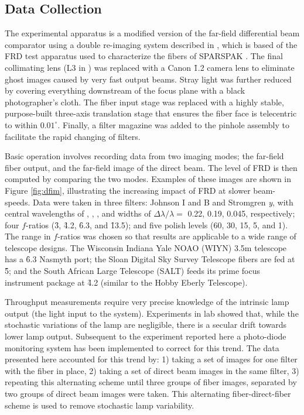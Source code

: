 \subsection{Data Collection}
\label{FRD:sec:direct}
The experimental apparatus is a modified version of the far-field
differential beam comparator using a double re-imaging system
described in \citet{Crause_08}, which is based of the FRD test
apparatus used to characterize the fibers of SPARSPAK
\citep{Mab_04}. The final collimating lens (L3 in \citet{Crause_08})
was replaced with a Canon \f1.2 camera lens to eliminate ghost images
caused by very fast output beams. Stray light was further reduced by
covering everything downstream of the focus plane with a black
photographer's cloth. The fiber input stage was replaced with a highly
stable, purpose-built three-axis translation stage that ensures the
fiber face is telecentric to within $0.01^{\circ}$. Finally, a filter
magazine was added to the pinhole assembly to facilitate the rapid
changing of filters.

Basic operation involves recording data from two imaging modes; the
far-field fiber output, and the far-field image of the direct
beam. The level of FRD is then computed by comparing the two modes.
Examples of these images are shown in Figure \ref{fig:dfim},
illustrating the increasing impact of FRD at slower beam-speeds. Data
were taken in three filters: Johnson I and B and Stromgren \emph{y},
with central wavelengths of \filtI, \filtB, \filty, and widths of
$\Delta\lambda/\lambda=$ 0.22, 0.19, 0.045, respectively; four
$f$-ratios (\f3, \f4.2, \f6.3, and \f13.5); and five polish
levels (60, 30, 15, 5, and 1\mum). The range in $f$-ratios was chosen
so that results are applicable to a wide range of telescope
designs. The Wisconsin Indiana Yale NOAO (WIYN) 3.5m telescope has a
\f6.3 Nasmyth port; the Sloan Digital Sky Survey Telescope fibers
are fed at \f5; and the South African Large Telescope (SALT) feeds its
prime focus instrument package at \f4.2 (similar to the Hobby Eberly
Telescope).

Throughput measurements require very precise knowledge of the
intrinsic lamp output (the light input to the system). Experiments in
lab showed that, while the stochastic variations of the lamp are
negligible, there is a secular drift towards lower lamp
output. Subsequent to the experiment reported here a photo-diode
monitoring system has been implemented to correct for this trend. The
data presented here accounted for this trend by: 1) taking a set of
images for one filter with the fiber in place, 2) taking a set of
direct beam images in the same filter, 3) repeating this alternating
scheme until three groups of fiber images, separated by two groups of
direct beam images were taken. This alternating fiber-direct-fiber
scheme is used to remove stochastic lamp variability.

